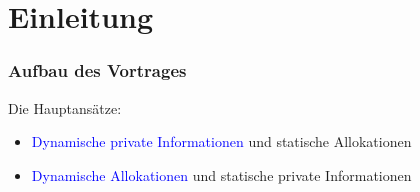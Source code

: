 \section{Einleitung}

\begin{frame}
\frametitle{Aufbau des Vortrages}
\justifying
Die Hauptans\"atze:
\begin{itemize}
    \item \textcolor{blue}{Dynamische private Informationen} und statische Allokationen
    \item \textcolor{blue}{Dynamische Allokationen} und statische private Informationen
\end{itemize}

\end{frame}
